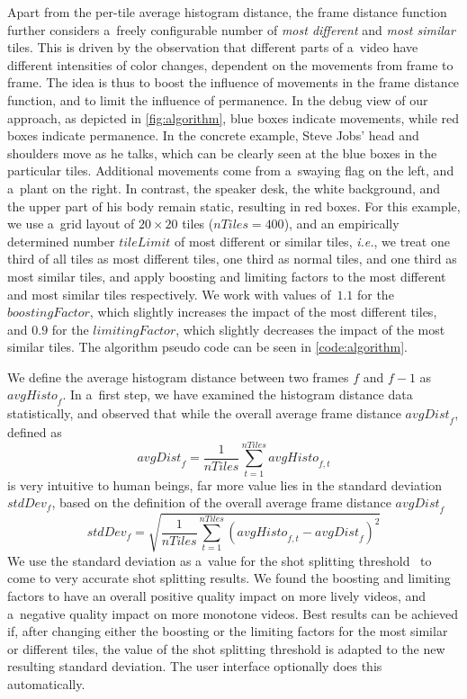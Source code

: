 Apart from the per-tile average histogram distance,
the frame distance function further considers
a~freely configurable number of \emph{most different} and
\emph{most similar} tiles.
This is driven by the observation that different parts
of a~video have different intensities of color changes,
dependent on the movements from frame to frame.
The idea is thus to boost the influence of movements in the frame
distance function, and to limit the influence of permanence.
In the debug view of our approach, as depicted in
\autoref{fig:algorithm}, blue boxes indicate movements,
while red boxes indicate permanence.
In the concrete example, Steve Jobs' head and shoulders move
as he talks, which can be clearly seen
at the blue boxes in the particular tiles.
Additional movements come from a~swaying flag on the left,
and a~plant on the right.
In contrast, the speaker desk, the white background,
and the upper part of his body remain static,
resulting in red boxes.
For this example, we use a~grid layout of
$\mathit{20} \times \mathit{20}$ tiles
($\mathit{nTiles} = \mathit{400}$),
and an empirically determined  number
$\mathit{tileLimit}$ of most different or similar tiles,
\emph{i.e.}, we treat one third of all tiles
as most different tiles, one third as normal tiles,
and one third as most similar tiles,
and apply boosting and limiting factors to the most different
and most similar tiles respectively.
We work with values of~$\mathit{1.1}$ for the
$\mathit{boostingFactor}$, which slightly increases
the impact of the most different tiles,
and $\mathit{0.9}$ for the $\mathit{limitingFactor}$,
which slightly decreases the impact of the most similar tiles.
The algorithm pseudo code can be seen in \autoref{code:algorithm}.

We define the average histogram distance between two frames
$\mathit{f}$ and $\mathit{f - 1}$ as $\mathit{avgHisto}_{f}$.
In a~first step, we have examined the histogram distance
data statistically, and observed that while
the overall average frame distance $\mathit{avgDist}_{f}$,
defined as $$\mathit{avgDist}_{f} =
\frac{1}{\mathit{nTiles}}\sum_{t=1}^{\mathit{nTiles}}
\mathit{avgHisto}_{f, t}$$ is very intuitive to human beings,
far more value lies in the standard deviation
$\mathit{stdDev}_{f}$, based on the definition of the overall
average frame distance $\mathit{avgDist}_{f}$
$$\mathit{stdDev}_{f} =
\sqrt{\frac{1}{\mathit{nTiles}}\sum_{t=1}^{\mathit{nTiles}}
(\mathit{avgHisto}_{f, t} - \mathit{avgDist}_{f})^{2}}$$
We use the standard deviation as a~value for the shot splitting
threshold~\cite{lienhart1999comparison}
to come to very accurate shot splitting results.
We found the boosting and limiting factors to have an overall
positive quality impact on more lively videos,
and a~negative quality impact on more monotone videos.
Best results can be achieved if,
after changing either the boosting or the limiting factors
for the most similar or different tiles,
the value of the shot splitting threshold is adapted
to the new resulting standard deviation.
The user interface optionally does this automatically.

